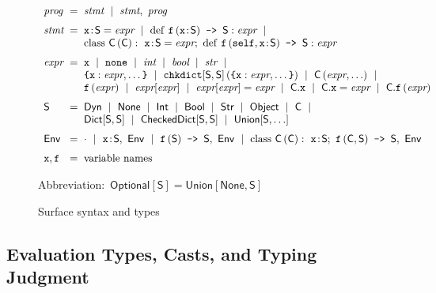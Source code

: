 \documentclass[english,cleveref,submission]{programming}
\makeatletter
\newcommand{\code}[1]{\texttt{#1}}
\newcommand{\defeq}{=}
\newcommand{\langmid}{~\mid~} %
\newenvironment{langarray}{\(\begin{array}{l@{\hspace{2mm}}c@{\hspace{2mm}}l}}{\end{array}\)}
\newcommand{\spapp}[2]{#1\,(#2)}
\newcommand{\spann}[2]{#1\!:\!#2}
\newcommand{\typefont}[1]{\mathsf{#1}}
\newcommand{\codefont}[1]{\emph{#1}}
\newcommand{\paramtype}[2]{#1[#2]}
\newcommand{\sptype}{\typefont{S}}
\newcommand{\sptclass}{\typefont{C}}
\newcommand{\sptint}{\typefont{Int}}
\newcommand{\sptstr}{\typefont{Str}}
\newcommand{\sptbool}{\typefont{Bool}}
\newcommand{\sptdyn}{\typefont{Dyn}}
\newcommand{\sptobject}{\typefont{Object}}
\newcommand{\sptnone}{\typefont{None}}
\newcommand{\sptoptional}[1]{\paramtype{\typefont{Optional}}{#1}}
\newcommand{\sptunion}[1]{\paramtype{\typefont{Union}}{#1}}
\newcommand{\sptrawpydict}{\typefont{Dict}}
\newcommand{\sptrawchkdict}{\typefont{CheckedDict}} %
\newcommand{\sptpydict}[2]{\paramtype{\sptrawpydict}{#1, #2}}
\newcommand{\sptchkdict}[2]{\paramtype{\sptrawchkdict}{#1, #2}}
\newcommand{\sptenv}{\typefont{Env}}
\newcommand{\sptenvnil}{\cdot}
\newcommand{\sptvardef}[2]{\spann{#1}{#2}}
\newcommand{\sptfundef}[3]{\spapp{#1}{#2}\code{ -> }#3}
\newcommand{\sptclassdef}[4]{\mathrm{class}~\spapp{#1}{#2}:~#3;~#4}
\newcommand{\spx}{\code{x}}
\newcommand{\spf}{\code{f}}
\newcommand{\spc}{\sptclass}
\newcommand{\spprog}{\codefont{prog}}
\newcommand{\spstmt}{\codefont{stmt}}
\newcommand{\spexpr}{\codefont{expr}}
\newcommand{\spvardef}[3]{\sptvardef{#1}{#2} = #3}
\newcommand{\spfundef}[4]{\mathrm{def}~\spapp{#1}{#2}\code{ -> }#3: #4}
\newcommand{\spclassdef}[4]{\mathrm{class}~\spapp{#1}{#2}:~#3;~#4}
\newcommand{\spself}{\code{self}}
\newcommand{\spnone}{\code{none}}
\newcommand{\spint}{\codefont{int}}
\newcommand{\spbool}{\codefont{bool}}
\newcommand{\spstr}{\codefont{str}}
\newcommand{\sppydict}[1]{\code{\{}#1\code{\}}}
\newcommand{\spchkdict}[3]{\spapp{\paramtype{\code{chkdict}}{#1, #2}}{#3}}
\newcommand{\spcnew}[2]{\spapp{#1}{#2}}
\newcommand{\spdictref}[2]{#1[#2]}
\newcommand{\spdictset}[3]{\spdictref{#1}{#2} = #3}
\newcommand{\spobjref}[2]{#1.#2}
\newcommand{\spobjset}[3]{\spobjref{#1}{#2} = #3}
\newcommand{\spobjapp}[3]{\spobjref{#1}{\spapp{#2}{#3}}}
\makeatother
\begin{document}
\begin{figure}[t]
  \begin{langarray}
    \spprog & \defeq &
      \spstmt \langmid \spstmt,~\spprog
    \\[1.5ex]
    \spstmt & \defeq &
      \spvardef{\spx}{\sptype}{\spexpr} \langmid
      \spfundef{\spf}{\spann{\spx}{\sptype}}{\sptype}{\spexpr} \langmid
  \\ & &
      \spclassdef{\spc}{\spc}{\spvardef{\spx}{\sptype}{\spexpr}}{\spfundef{\spf}{\spself, \spann{\spx}{\sptype}}{\sptype}{\spexpr}}
    \\[1.5ex]
    \spexpr & \defeq &
      \spx \langmid \spnone \langmid \spint \langmid \spbool \langmid \spstr \langmid
  \\ & &
      \sppydict{\spx: \spexpr, \ldots} \langmid
      \spchkdict{\sptype}{\sptype}{\sppydict{\spx: \spexpr, \ldots}} \langmid
      \spcnew{\sptclass}{\spexpr, \ldots} \langmid
  \\ & &
      \spapp{\spf}{\spexpr} \langmid
      \spdictref{\spexpr}{\spexpr} \langmid
      \spdictset{\spexpr}{\spexpr}{\spexpr} \langmid
      \spobjref{\spc}{\spx} \langmid
      \spobjset{\spc}{\spx}{\spexpr} \langmid
      \spobjapp{\spc}{\spf}{\spexpr}
    \\[1.5ex]
    \sptype & \defeq &
      \sptdyn \langmid
      \sptnone \langmid
      \sptint \langmid
      \sptbool \langmid
      \sptstr \langmid
      \sptobject \langmid
      \sptclass \langmid
  \\ & &
      \sptpydict{\sptype}{\sptype} \langmid
      \sptchkdict{\sptype}{\sptype} \langmid
      \sptunion{\sptype, \ldots}
    \\[1.5ex]
    \sptenv & \defeq &
      \sptenvnil \langmid
      \sptvardef{\spx}{\sptype},~\sptenv \langmid
      \sptfundef{\spf}{\sptype}{\sptype},~\sptenv \langmid
      \sptclassdef{\spc}{\spc}{\sptvardef{\spx}{\sptype}}{\sptfundef{\spf}{\sptclass, \sptype}{\sptype}},~\sptenv
    \\[1.5ex]
    \spx, \spf & \defeq & \mbox{variable names}
  \end{langarray}

  \bigskip
  \mbox{Abbreviation: $\sptoptional{\sptype} \defeq \sptunion{\sptnone, \sptype}$}

  \caption{Surface syntax and types}
  \label{f:surface-types}
\end{figure}


\subsection{Evaluation Types, Casts, and Typing Judgment}
\label{s:eval-types}
\end{document}

